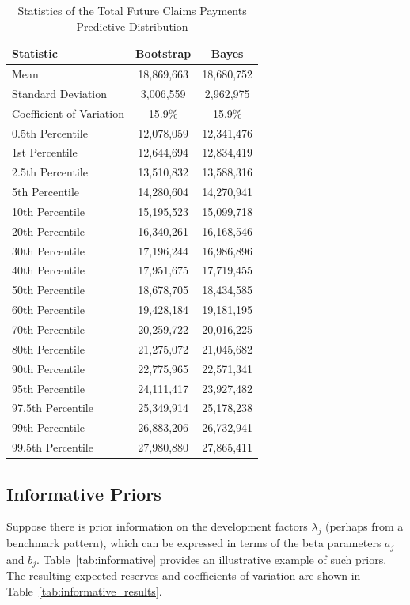 \documentclass[aps,pre,draft]{revtex4-2}
\begin{document}
\begin{table}[htbp]
\centering
\caption{Statistics of the Total Future Claims Payments Predictive Distribution}
\label{tab:pred_results}
\begin{tabular}{lcc}
\toprule
Statistic & Bootstrap & Bayes \\
\midrule
Mean & 18,869,663 & 18,680,752 \\
Standard Deviation & 3,006,559 & 2,962,975 \\
Coefficient of Variation & 15.9\% & 15.9\% \\
0.5th Percentile & 12,078,059 & 12,341,476 \\
1st Percentile & 12,644,694 & 12,834,419 \\
2.5th Percentile & 13,510,832 & 13,588,316 \\
5th Percentile & 14,280,604 & 14,270,941 \\
10th Percentile & 15,195,523 & 15,099,718 \\
20th Percentile & 16,340,261 & 16,168,546 \\
30th Percentile & 17,196,244 & 16,986,896 \\
40th Percentile & 17,951,675 & 17,719,455 \\
50th Percentile & 18,678,705 & 18,434,585 \\
60th Percentile & 19,428,184 & 19,181,195 \\
70th Percentile & 20,259,722 & 20,016,225 \\
80th Percentile & 21,275,072 & 21,045,682 \\
90th Percentile & 22,775,965 & 22,571,341 \\
95th Percentile & 24,111,417 & 23,927,482 \\
97.5th Percentile & 25,349,914 & 25,178,238 \\
99th Percentile & 26,883,206 & 26,732,941 \\
99.5th Percentile & 27,980,880 & 27,865,411 \\
\bottomrule
\end{tabular}%
\end{table}

\subsection{Informative Priors}

Suppose there is prior information on the development factors $\lambda_j$ (perhaps from a benchmark pattern), 
which can be 
expressed in terms of the beta parameters $a_j$ and $b_j$. Table~\ref{tab:informative} 
provides an illustrative example of such priors. The resulting expected reserves and coefficients of variation 
are shown in Table~\ref{tab:informative_results}.
\end{document}
